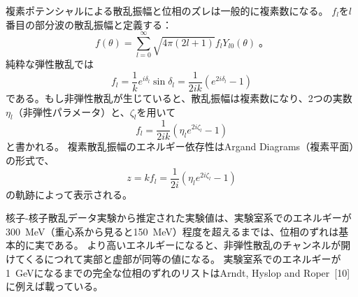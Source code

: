 \documentclass[a4paper,11pt,uplatex]{jsarticle}
\begin{document}
複素ポテンシャルによる散乱振幅と位相のズレは一般的に複素数になる。
$f_l$を$l$番目の部分波の散乱振幅と定義する：
\begin{equation}
  f(\theta)=\sum_{l=0}^\infty \sqrt{4\pi(2l+1)}f_lY_{l0}(\theta)\;。
\end{equation}
純粋な弾性散乱では
\begin{equation}
  f_l=\frac{1}{k}e^{i\delta_l}\sin{\delta_l}=\frac{1}{2ik}(e^{2i\delta_l}-1)
\end{equation}
である。もし非弾性散乱が生じていると、散乱振幅は複素数になり、2つの実数$\eta_{l}$（非弾性パラメータ）と、$\zeta_l$を用いて
\begin{equation}
  f_l=\frac{1}{2ik}(\eta_{l}e^{2i\zeta_l}-1)
\end{equation}
と書かれる。
複素散乱振幅のエネルギー依存性はArgand Diagrams（複素平面）の形式で、
\begin{equation}
  z=kf_l=\frac{1}{2i}(\eta_{l}e^{2i\zeta_l}-1)
\end{equation}
の軌跡によって表示される。

核子-核子散乱データ実験から推定された実験値は、実験室系でのエネルギーが\SI{300}{MeV}（重心系から見ると\SI{150}{MeV}）程度を超えるまでは、位相のずれは基本的に実である。
より高いエネルギーになると、非弾性散乱のチャンネルが開けてくるにつれて実部と虚部が同等の値になる。
実験室系でのエネルギーが\SI{1}{GeV}になるまでの完全な位相のずれのリストはArndt, Hyslop and Roper~[10]に例えば載っている。
\end{document}
